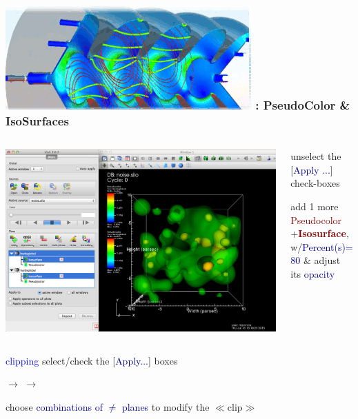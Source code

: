 \begin{frame}
\frametitle{\href{https://wci.llnl.gov/simulation/computer-codes/visit/}{\includegraphics[height=.85cm]{figs/visit-logos/VisIt-02}} \hspace{-.85cm}{\bf \textcolor{lightgray}{VisIt}}: PseudoColor \& IsoSurfaces}
\vspace{-1.5mm}
\begin{columns}%
\begin{column}{9cm}
        \centering
        \includegraphics[width=\columnwidth]{figs/visit-pract/VisIt_pseudocolor-isosurf_2}
\end{column}
\begin{column}{3cm}
        \pause
        \textcolor{DarkBlue}{}
        unselect the [\textcolor{DarkBlue}{Apply ...}] check-boxes

        \vspace{2mm}
        \textcolor{DarkBlue}{} add 1 more
                \textcolor{DarkRed}{Pseudocolor}
                +\textcolor{DarkRed}{\bf Isosurface},
        \\
        w/\textcolor{DarkBlue}{Percent(s)=80}
        \& adjust its
        \textcolor{DarkBlue}{opacity}
\end{column}
\end{columns}

\pause
\vspace{2mm}
\textcolor{DarkBlue}{}
        \textcolor{blue}{clipping}  select/check the [\textcolor{DarkBlue}{Apply...}] boxes

\textcolor{DarkBlue}{}
                $\rightarrow$ 
        $\rightarrow$ \framebox{\textcolor{DarkRed}{\bf Clip}}

        \hspace{5mm}
         choose \textcolor{DarkBlue}{combinations of $\ne$ planes} to modify the $\ll$clip$\gg$
\end{frame}
